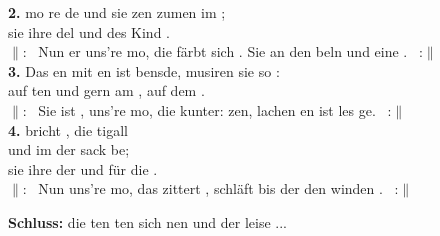 \textbf{2.} mo  re de und sie zen zumen im ; \\
sie  ihre del und des Kind . \\
$\|$:~ Nun er uns're mo, die  färbt sich . 
Sie  an den beln und  eine . ~:$\|$ \\[0.5em]
\noindent\textbf{3.} Das en mit en ist bensde, musiren  sie so : \\
auf ten und gern am , auf dem . \\
$\|$:~ Sie ist , uns're mo, die  kunter: 
zen, lachen en ist les ge. ~:$\|$ \\[0.5em]
\noindent\textbf{4.}  bricht , die tigall  \\und im  der sack be; \\
sie  ihre der und  für die . \\
$\|$:~ Nun  uns're mo, das  zittert , 
 schläft bis der  den winden . ~:$\|$

\noindent\textbf{Schluss:}  die ten ten sich nen und der  leise ...
